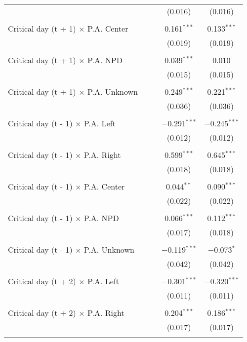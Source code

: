 \documentclass[
]{article}
\begin{document}
\begin{table}[!htbp]
{\begin{tabular}{@{\extracolsep{5pt}}lcccc}
  &  &  & (0.016) & (0.016) \\ 
  & & & & \\ 
 Critical day (t + 1) $\times$ P.A. Center &  &  & 0.161$^{***}$ & 0.133$^{***}$ \\ 
  &  &  & (0.019) & (0.019) \\ 
  & & & & \\ 
 Critical day (t + 1) $\times$ P.A. NPD &  &  & 0.039$^{***}$ & 0.010 \\ 
  &  &  & (0.015) & (0.015) \\ 
  & & & & \\ 
 Critical day (t + 1) $\times$ P.A. Unknown &  &  & 0.249$^{***}$ & 0.221$^{***}$ \\ 
  &  &  & (0.036) & (0.036) \\ 
  & & & & \\ 
 Critical day (t - 1) $\times$ P.A. Left &  &  & $-$0.291$^{***}$ & $-$0.245$^{***}$ \\ 
  &  &  & (0.012) & (0.012) \\ 
  & & & & \\ 
 Critical day (t - 1) $\times$ P.A. Right &  &  & 0.599$^{***}$ & 0.645$^{***}$ \\ 
  &  &  & (0.018) & (0.018) \\ 
  & & & & \\ 
 Critical day (t - 1) $\times$ P.A. Center &  &  & 0.044$^{**}$ & 0.090$^{***}$ \\ 
  &  &  & (0.022) & (0.022) \\ 
  & & & & \\ 
 Critical day (t - 1) $\times$ P.A. NPD &  &  & 0.066$^{***}$ & 0.112$^{***}$ \\ 
  &  &  & (0.017) & (0.018) \\ 
  & & & & \\ 
 Critical day (t - 1) $\times$ P.A. Unknown &  &  & $-$0.119$^{***}$ & $-$0.073$^{*}$ \\ 
  &  &  & (0.042) & (0.042) \\ 
  & & & & \\ 
 Critical day (t + 2) $\times$ P.A. Left &  &  & $-$0.301$^{***}$ & $-$0.320$^{***}$ \\ 
  &  &  & (0.011) & (0.011) \\ 
  & & & & \\ 
 Critical day (t + 2) $\times$ P.A. Right &  &  & 0.204$^{***}$ & 0.186$^{***}$ \\ 
  &  &  & (0.017) & (0.017) \\ 
  & & & & \\ 

\end{tabular}}
\end{table}
\end{document}
